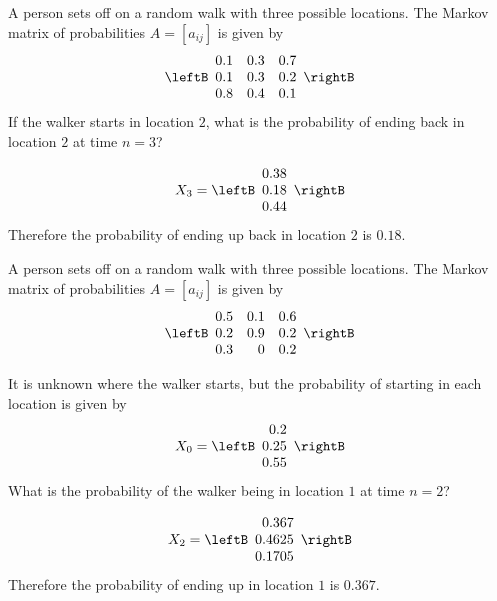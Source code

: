 \begin{enumialphparenastyle}
\begin{ex} A person sets off on a random walk with three possible locations. The Markov matrix of probabilities $A = [a_{ij}]$ is given by
\[
\leftB
\begin{array}{rrr}
0.1 & 0.3 & 0.7 \\
0.1 & 0.3 & 0.2 \\
0.8 & 0.4 & 0.1
\end{array}
\rightB
\]
If the walker starts in location $2$, what is the probability of ending back in location $2$ at time $n = 3$?
\begin{sol}
\[
X_{3} = \leftB
\begin{array}{r}
0.38 \\
0.18 \\
0.44
\end{array}
\rightB
\]
Therefore the probability of ending up back in location $2$ is $0.18$. 
\end{sol}
\end{ex}

\begin{ex} A person sets off on a random walk with three possible locations. The Markov matrix of probabilities $A = [a_{ij}]$ is given by
\[
\leftB
\begin{array}{rrr}
0.5 & 0.1 & 0.6 \\
0.2 & 0.9 & 0.2 \\
0.3 & 0 & 0.2
\end{array}
\rightB
\]

It is unknown where the walker starts, but the probability of starting in each location is given by
\[
X_{0}
= \leftB \begin{array}{r}
0.2 \\
0.25 \\
0.55
\end{array}
\rightB
\]
What is the probability of the walker being in location $1$ at time $n = 2$?
\begin{sol}
\[
X_{2} = \leftB
\begin{array}{r}
0.367 \\
0.4625 \\
0.1705
\end{array}
\rightB
\]
Therefore the probability of ending up in location $1$ is $0.367$. 
\end{sol}
\end{ex}



\end{enumialphparenastyle}
